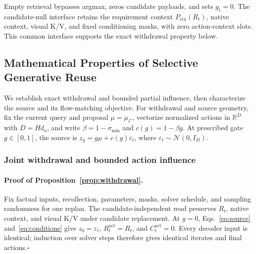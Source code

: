 Empty retrieval bypasses argmax, zeros candidate payloads, and sets $g_t=0$.
The candidate-null interface retains the requirement context $P_{\mathrm{ctx}}(R_t)$, native context, visual K/V, and fixed conditioning masks, with zero action-context slots.
This common interface supports the exact withdrawal property below.

\subsection{Mathematical Properties of Selective Generative Reuse}
\label{app:theory}
\label{app:source_properties}

We establish exact withdrawal and bounded partial influence, then characterize the source and its flow-matching objective.
For withdrawal and source geometry, fix the current query and proposal $\mu=\mu_{i^\star}$, vectorize normalized actions in $\mathbb R^D$ with $D=Hd_a$, and write $\beta=1-\sigma_{\min}$ and $c(g)=1-\beta g$.
At prescribed gate $g\in[0,1]$, the source is $z_g=g\mu+c(g)\varepsilon_t$, where $\varepsilon_t\sim\mathcal N(0,I_D)$.

\subsubsection{Joint withdrawal and bounded action influence}
\label{app:influence_proof}

\paragraph{Proof of Proposition~\ref{prop:withdrawal}.}
Fix factual inputs, recollection, parameters, masks, solver schedule, and sampling randomness for one replan.
The candidate-independent read preserves $R_t$, native context, and visual K/V under candidate replacement.
At $g=0$, Eqs.~\eqref{eq:source} and~\eqref{eq:conditions} give $z_0=\varepsilon_t$, $R_t^{\mathrm{act}}=R_t$, and $C_t^{\mathrm{act}}=0$.
Every decoder input is identical; induction over solver steps therefore gives identical iterates and final actions.\hfill$\square$

